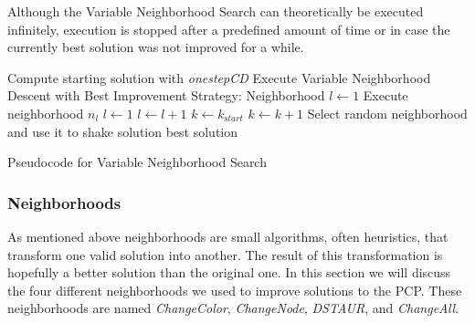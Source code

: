 \documentclass[paper = a4, fontsize = 10pt]{scrartcl}
\begin{document}
{Although the Variable Neighborhood Search can theoretically be executed infinitely, execution is stopped after a predefined amount of time or in case the currently best solution was not improved for a while.

\begin{algorithm}
\begin{algorithmic}[1]
\State Compute starting solution with \emph{onestepCD}
\State Execute Variable Neighborhood Descent with Best Improvement Strategy:
\State Neighborhood $l \leftarrow 1$
\State Execute neighborhood $n_l$
\State  $l\leftarrow 1$
\Else
\State  $l\leftarrow l + 1$
\EndIf
\EndWhile
{}
\State $k \leftarrow k_{\mathrm start}$
\Else
\State $k \leftarrow k + 1$
\EndIf
\State Select random neighborhood and use it to shake solution
\EndWhile
\State\Return best solution
\end{algorithmic}
\caption{Pseudocode for Variable Neighborhood Search}
\end{algorithm}
}

\subsubsection{Neighborhoods}
\label{sec:neigh}
As mentioned above neighborhoods are small algorithms, often heuristics, that transform one valid solution into another. The result of this transformation is hopefully a better solution than the original one. In this section we will discuss the four different neighborhoods we used to improve solutions to the PCP. These neighborhoods are named \emph{ChangeColor}, \emph{ChangeNode}, \emph{DSTAUR}, and \emph{ChangeAll}.

\end{document}
